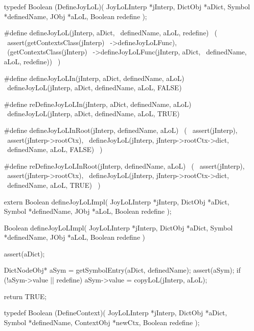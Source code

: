 \startCHeader
typedef Boolean (DefineJoyLoL)(
  JoyLoLInterp *jInterp,
  DictObj      *aDict,
  Symbol       *definedName,
  JObj         *aLoL,
  Boolean       redefine
);

#define defineJoyLoL(jInterp, aDict,      \
  definedName, aLoL, redefine)            \
  (                                       \
    assert(getContextsClass(jInterp)      \
      ->defineJoyLoLFunc),                \
    (getContextsClass(jInterp)            \
      ->defineJoyLoLFunc(jInterp, aDict,  \
        definedName, aLoL, redefine))     \
  )

#define defineJoyLoLIn(jInterp, aDict, definedName, aLoL) \
  defineJoyLoL(jInterp, aDict, definedName, aLoL, FALSE)

#define reDefineJoyLoLIn(jInterp, aDict, definedName, aLoL) \
  defineJoyLoL(jInterp, aDict, definedName, aLoL, TRUE)

#define defineJoyLoLInRoot(jInterp, definedName, aLoL)  \
  (                                                     \
    assert(jInterp),                                    \
    assert(jInterp->rootCtx),                           \
    defineJoyLoL(jInterp, jInterp->rootCtx->dict,       \
      definedName, aLoL, FALSE)                         \
  )

#define reDefineJoyLoLInRoot(jInterp, definedName, aLoL)  \
  (                                                       \
    assert(jInterp),                                      \
    assert(jInterp->rootCtx),                             \
    defineJoyLoL(jInterp, jInterp->rootCtx->dict,         \
      definedName, aLoL, TRUE)                            \
  )
\stopCHeader

\setCHeaderStream{private}
\startCHeader
extern Boolean defineJoyLoLImpl(
  JoyLoLInterp *jInterp,
  DictObj      *aDict,
  Symbol       *definedName,
  JObj         *aLoL,
  Boolean       redefine
);
\stopCHeader
\setCHeaderStream{public}

\startCCode
Boolean defineJoyLoLImpl(
  JoyLoLInterp *jInterp,
  DictObj      *aDict,
  Symbol       *definedName,
  JObj         *aLoL,
  Boolean       redefine
) {
  assert(aDict);
  
  DictNodeObj* aSym = getSymbolEntry(aDict, definedName);
  assert(aSym);
  if (!aSym->value || redefine) {
    aSym->value = copyLoL(jInterp, aLoL);
  }

  return TRUE;
}
\stopCCode

\startCHeader
typedef Boolean (DefineContext)(
  JoyLoLInterp *jInterp,
  DictObj      *aDict,
  Symbol       *definedName,
  ContextObj   *newCtx,
  Boolean       redefine
);

